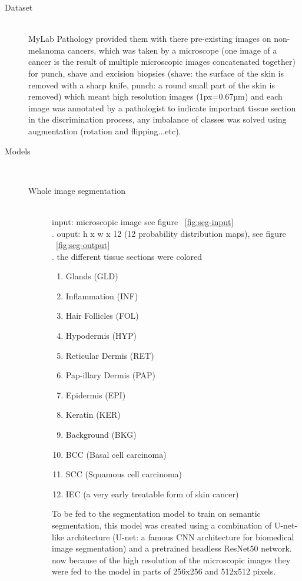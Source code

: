 \begin{description}
\item[Dataset] \hfill \\
    MyLab Pathology provided them with there pre-existing images on non-melanoma cancers, which was taken by a microscope (one image of a cancer is the result of multiple microscopic images concatenated together) for punch, shave and excision biopsies (shave: the surface of the skin is removed with a sharp knife, punch: a round small part of the skin is removed) which meant high resolution images (1px=0.67µm) and each image was annotated by a pathologist to indicate important tissue section in the discrimination process, any imbalance of classes was solved using augmentation (rotation and flipping...etc).

\item[Models] \hfill \\
    \begin{description}
    \item[Whole image segmentation] \hfill \\
        input: microscopic image  see figure ~\ref{fig:seg-input} \hfill \\.
        ouput: h x w x 12 (12 probability distribution maps), see figure ~\ref{fig:seg-output}  \hfill \\.
        the different tissue sections were colored 
        \begin{enumerate}
            \item Glands (GLD) 
            \item Inflammation (INF) 
            \item Hair Follicles (FOL) 
            \item Hypodermis (HYP) 
            \item Reticular Dermis (RET) 
            \item Pap-illary Dermis (PAP) 
            \item Epidermis (EPI) 
            \item Keratin (KER) 
            \item Background (BKG) 
            \item BCC (Basal cell carcinoma)
            \item SCC (Squamous cell carcinoma)
            \item IEC (a very early treatable form of skin cancer)
        \end{enumerate}
        To be fed to the segmentation model to train on semantic segmentation, this model was created using a combination of U-net-like architecture (U-net: a famous CNN architecture for biomedical image segmentation) and a pretrained headless ResNet50 network. now because of the high resolution of the microscopic images they were fed to the model in parts of 256x256 and 512x512 pixels.


\end{description}
\end{description}
